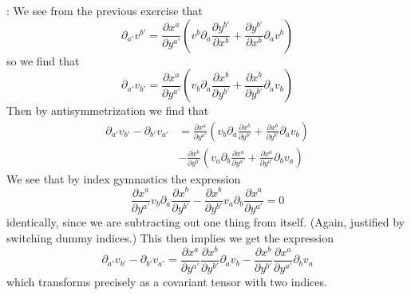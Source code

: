 :
 We see from the previous exercise that \begin {equation}\partial _{a'}v^{b'} = \frac {\partial x^{a}}{\partial y^{a'}}\left (v^{b}\partial _{a}\frac {\partial y^{b'}}{\partial x^{b}} + \frac {\partial y^{b'}}{\partial x^{b}}\partial _{a}v^{b}\right ) \end {equation} so we find that \begin {equation}\partial _{a'}v_{b'} = \frac {\partial x^{a}}{\partial y^{a'}}\left (v_{b}\partial _{a}\frac {\partial x^{b}}{\partial y^{b'}} + \frac {\partial x^{b}}{\partial y^{b'}}\partial _{a}v_{b}\right ) \end {equation} Then by antisymmetrization we find that \begin {subequations} \begin {align} \partial _{a'}v_{b'}-\partial _{b'}v_{a'} &= \frac {\partial x^{a}}{\partial y^{a'}}\left (v_{b}\partial _{a}\frac {\partial x^{b}}{\partial y^{b'}} + \frac {\partial x^{b}}{\partial y^{b'}}\partial _{a}v_{b}\right ) \nonumber \\ & - \frac {\partial x^{b}}{\partial y^{b'}}\left (v_{a}\partial _{b}\frac {\partial x^{a}}{\partial y^{a'}}+\frac {\partial x^{a}}{\partial y^{a'}}\partial _{b}v_{a}\right ) \end {align} \end {subequations} We see that by index gymnastics the expression \begin {equation}\frac {\partial x^{a}}{\partial y^{a'}}v_{b}\partial _{a}\frac {\partial x^{b}}{\partial y^{b'}}-\frac {\partial x^{b}}{\partial y^{b'}} v_{a}\partial _{b}\frac {\partial x^{a}}{\partial y^{a'}} = 0 \end {equation} identically, since we are subtracting out one thing from itself. (Again, justified by switching dummy indices.) This then implies we get the expression \begin {equation}\partial _{a'}v_{b'}-\partial _{b'}v_{a'} = \frac {\partial x^{a}}{\partial y^{a'}}\frac {\partial x^{b}}{\partial y^{b'}}\partial _{a}v_{b} - \frac {\partial x^{b}}{\partial y^{b'}}\frac {\partial x^{a}}{\partial y^{a'}}\partial _{b}v_{a} \end {equation} which transforms precisely as a covariant tensor with two indices.
